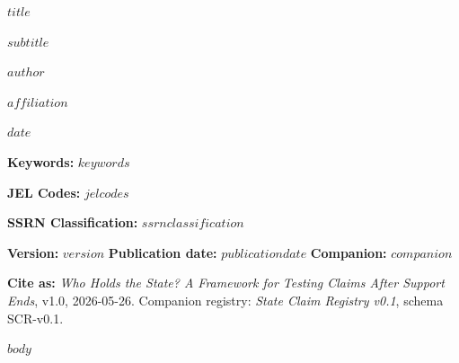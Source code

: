 \documentclass[12pt,a4paper]{article}
\begin{document}
\thispagestyle{empty}
\begin{center}
\vspace*{-0.55in}
{\LARGE\bfseries $title$\par}
\vspace{6pt}
{\Large $subtitle$\par}
\vspace{16pt}
{\large $author$\par}
\vspace{4pt}
{\small $affiliation$\par}
\vspace{12pt}
{\large $date$\par}
\end{center}

\vspace{8pt}
\begin{abstract}
\small
\noindent
$abstract$
\end{abstract}

\smallskip
\noindent\textbf{Keywords:} $keywords$

\smallskip
\noindent\textbf{JEL Codes:} $jelcodes$

\smallskip
\noindent\textbf{SSRN Classification:} $ssrnclassification$

\smallskip
\noindent\textbf{Version:} $version$ \quad \textbf{Publication date:} $publicationdate$ \quad \textbf{Companion:} $companion$

\smallskip
\noindent\textbf{Cite as:} \emph{Who Holds the State? A Framework for Testing Claims After Support Ends}, v1.0, 2026-05-26. Companion registry: \emph{State Claim Registry v0.1}, schema SCR-v0.1.

\newpage
\setcounter{page}{1}
\onehalfspacing

$body$
\end{document}
